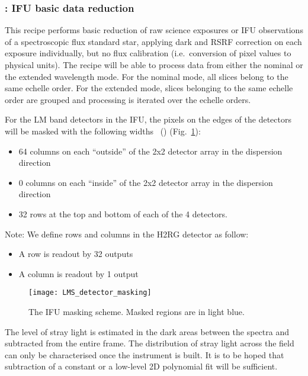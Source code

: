 \clearpage
\subsubsection{: IFU basic data reduction}
\label{sssec:ifu_sci_process}
\label{rec:metis_ifu_sci_process}
\label{sssec:ifu_reduce}
\label{rec:metis_ifu_reduce}

This recipe performs basic reduction of raw science exposures or IFU
observations of a spectroscopic flux standard star, applying
dark and RSRF correction on each exposure individually, but no flux calibration
(i.e.~conversion of pixel values to physical units).
The
recipe will be able to process data from either the nominal or the
extended wavelength mode. For the nominal mode, all slices belong to
the same echelle order. For the extended mode, slices belonging to the
same echelle order are grouped and processing is iterated over the
echelle orders.

For the LM band detectors in the IFU, the pixels on the edges of the detectors will be masked with the following widths~\cite{matisse_minutes} () (Fig.~\ref{fig:ifu_detector_masking}):
\begin{itemize}
\item 64 columns on each ``outside'' of the 2x2 detector array in the dispersion direction
\item 0 columns on each ``inside'' of the 2x2 detector array in the dispersion direction
\item 32 rows at the top and bottom of each of the 4 detectors.
\end{itemize}
Note: We define rows and columns in the H2RG detector as follow:
\begin{itemize}
\item A row is readout by 32 outputs
\item A column is readout by 1 output
\end{itemize}

\begin{figure}[hb]
  \centering
  \texttt{[image: LMS\_detector\_masking]}
  \caption[The IFU masking scheme]{%
    The IFU masking scheme. Masked regions are in light blue.}
  \label{fig:ifu_detector_masking}
\end{figure}



The level of stray light is estimated in the dark areas between the
spectra and subtracted from the entire frame. The distribution of
stray light across the field can only be characterised once the
instrument is built. It is to be hoped that subtraction of a constant
or a low-level 2D polynomial fit will be sufficient.

